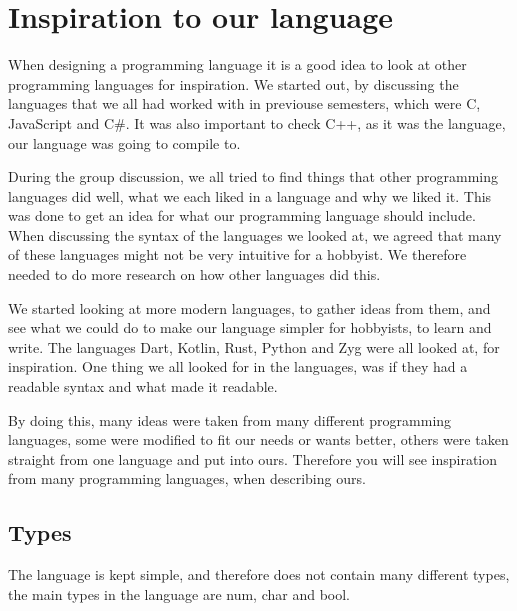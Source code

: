\section{Inspiration to our language}
When designing a programming language it is a good idea to look at other programming languages for inspiration. We started out, by discussing the languages that we all had worked with in previouse semesters, which were C, JavaScript and C\#. It was also important to check C++, as it was the language, our language was going to compile to.

During the group discussion, we all tried to find things that other programming languages did well, what we each liked in a language and why we liked it. This was done to get an idea for what our programming language should include.
When discussing the syntax of the languages we looked at, we agreed that many of these languages might not be very intuitive for a hobbyist. We therefore needed to do more research on how other languages did this.

We started looking at more modern languages, to gather ideas from them, and see what we could do to make our language simpler for hobbyists, to learn and write. The languages Dart, Kotlin, Rust, Python and Zyg were all looked at, for inspiration. One thing we all looked for in the languages, was if they had a readable syntax and what made it readable.

By doing this, many ideas were taken from many different programming languages, some were modified to fit our needs or wants better, others were taken straight from one language and put into ours. Therefore you will see inspiration from many programming languages, when describing ours.



\subsection{Types}
The language is kept simple, and therefore does not contain many different types, the main types in the language are num, char and bool.

